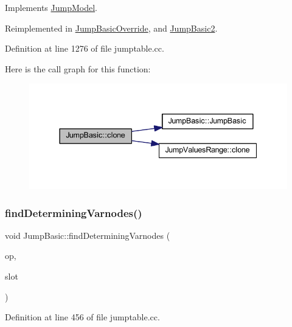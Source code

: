 Implements \mbox{\hyperlink{class_jump_model_af4eef0f1c319eb049c518631a0321ddd}{Jump\+Model}}.



Reimplemented in \mbox{\hyperlink{class_jump_basic_override_a139a81aba7b857ef37cf1ffa52e799b3}{Jump\+Basic\+Override}}, and \mbox{\hyperlink{class_jump_basic2_a8d19ff3f441509f74402fdbefabb0801}{Jump\+Basic2}}.



Definition at line 1276 of file jumptable.\+cc.

Here is the call graph for this function\+:
\nopagebreak
\begin{figure}[H]
\begin{center}
\leavevmode
\includegraphics[width=337pt]{class_jump_basic_a3f79f34542045666ebfc491e83f2bc27_cgraph}
\end{center}
\end{figure}
\mbox{\label{class_jump_basic_a4a9fc453c42caeb6857b80d4e216d544}} 
\subsubsection{\texorpdfstring{findDeterminingVarnodes()}{findDeterminingVarnodes()}}
{\footnotesize\ttfamily void Jump\+Basic\+::find\+Determining\+Varnodes (\begin{DoxyParamCaption}\item[{\mbox{\hyperlink{class_pcode_op}{Pcode\+Op}} $\ast$}]{op,  }\item[{int4}]{slot }\end{DoxyParamCaption})\hspace{0.3cm}{\ttfamily [protected]}}



Definition at line 456 of file jumptable.\+cc.

